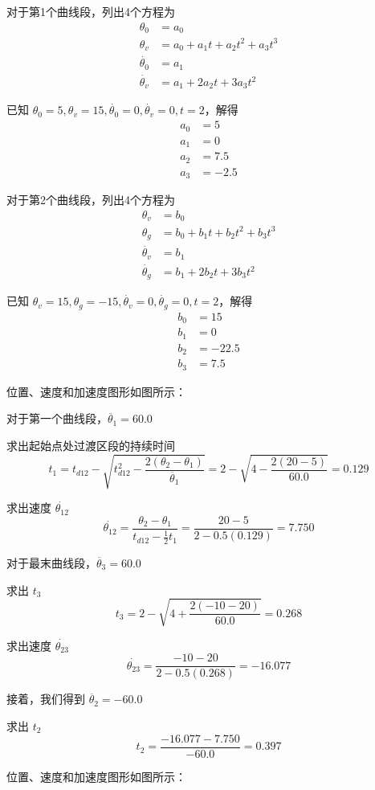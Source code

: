 \documentclass{homework}
\begin{document}
\begin{sol}

对于第1个曲线段，列出4个方程为
\begin{align*}
  \theta_0 &= a_0 \\
  \theta_v &= a_0 + a_1 t + a_2 t^2 + a_3 t^3 \\
  \dot{\theta_0} &= a_1 \\
  \dot{\theta_v} &= a_1 + 2 a_2 t + 3 a_3 t^2
\end{align*}

已知 $ \theta_0 = 5, \theta_v = 15, \dot{\theta_0} = 0, \dot{\theta_v} = 0, t = 2 $，解得
\begin{align*}
  a_0 &= 5 \\
  a_1 &= 0 \\
  a_2 &= 7.5 \\
  a_3 &= -2.5
\end{align*}

对于第2个曲线段，列出4个方程为
\begin{align*}
  \theta_v &= b_0 \\
  \theta_g &= b_0 + b_1 t + b_2 t^2 + b_3 t^3 \\
  \dot{\theta_v} &= b_1 \\
  \dot{\theta_g} &= b_1 + 2 b_2 t + 3 b_3 t^2
\end{align*}

已知 $ \theta_v = 15, \theta_g = -15, \dot{\theta_v} = 0, \dot{\theta_g} = 0, t = 2 $，解得
\begin{align*}
  b_0 &= 15 \\
  b_1 &= 0 \\
  b_2 &= -22.5 \\
  b_3 &= 7.5
\end{align*}

位置、速度和加速度图形如图所示：

\end{sol}

\question

\begin{sol}

对于第一个曲线段，$ \ddot{\theta_1} = 60.0 $

求出起始点处过渡区段的持续时间
\[
  t_1 = t_{d12} - \sqrt{t_{d12}^2 - \frac{2(\theta_2 - \theta_1)}{\ddot{\theta_1}}} = 2 - \sqrt{4 - \frac{2(20 - 5)}{60.0}} = 0.129
\]

求出速度 $ \dot{\theta_{12}} $
\[
  \dot{\theta_{12}} = \frac{\theta_2 - \theta_1}{t_{d12} - \frac{1}{2} t_1} = \frac{20 - 5}{2 - 0.5(0.129)} = 7.750
\]  

对于最末曲线段，$ \ddot{\theta_3} = 60.0 $

求出 $ t_3 $
\[
  t_3 = 2 - \sqrt{4 + \frac{2(-10 - 20)}{60.0}} = 0.268
\]

求出速度 $ \dot{\theta_{23}} $
\[
  \dot{\theta_{23}} = \frac{-10 - 20}{2 - 0.5(0.268)} = -16.077
\]

接着，我们得到 $ \ddot{\theta_2} = -60.0 $

求出 $ t_2 $
\[
  t_2 = \frac{-16.077 - 7.750}{-60.0} = 0.397
\]

位置、速度和加速度图形如图所示：

\end{sol}
\end{document}
